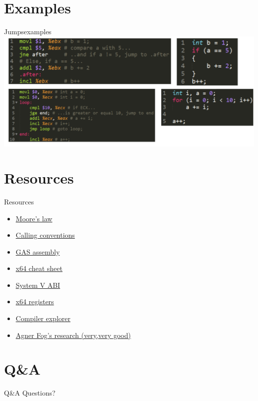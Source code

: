 \documentclass[
	11pt, %
	aspectratio=169, %
]{beamer}
\begin{document}
\section{Examples}
\def \sectiontitle{examples}
\begin{frame}{Jumps}{\sectiontitle}
    \includegraphics[scale=0.45]{./images/asm-program-examples.png}
\end{frame}

\section{Resources}
\def \sectiontitle{Resources}
\begin{frame}{Resources}
    \begin{itemize}
        \item \href{https://en.wikipedia.org/wiki/Moore\%27s_law}{Moore's law}
        \item \href{https://en.wikipedia.org/wiki/X86_calling_conventions\#System_V_AMD64_ABI}{Calling conventions}
        \item \href{https://en.wikibooks.org/wiki/X86_Assembly/GNU_assembly_syntax}{GAS assembly}
        \item \href{https://cs.brown.edu/courses/cs033/docs/guides/x64_cheatsheet.pdf}{x64 cheat sheet}
        \item \href{https://www.uclibc.org/docs/psABI-x86_64.pdf}{System V ABI}
        \item \href{https://learn.microsoft.com/en-us/windows-hardware/drivers/debugger/x64-architecture}{x64 registers}
        \item \href{https://godbolt.org}{Compiler explorer}
        \item \href{https://agner.org/}{Agner Fog's research (very,very good)}
    \end{itemize}

\end{frame}

\section{Q\&A}
\def \sectiontitle{Q\&A}
\begin{frame}{Q\&A}
    Questions?
\end{frame}
\end{document}
